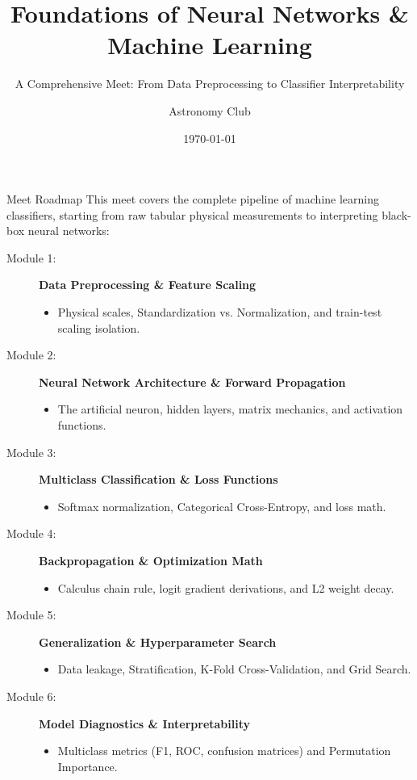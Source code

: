 \documentclass[9pt]{beamer}
\title{Foundations of Neural Networks \& Machine Learning}
\subtitle{A Comprehensive Meet: From Data Preprocessing to Classifier Interpretability}
\author{Astronomy Club}
\date{\today}
\begin{document}
\maketitle

\begin{frame}{Meet Roadmap}
  This meet covers the complete pipeline of machine learning classifiers, starting from raw tabular physical measurements to interpreting black-box neural networks:
  \begin{description}
    \item[Module 1:] \textbf{Data Preprocessing \& Feature Scaling}
      \begin{itemize}
        \item Physical scales, Standardization vs. Normalization, and train-test scaling isolation.
      \end{itemize}
    \item[Module 2:] \textbf{Neural Network Architecture \& Forward Propagation}
      \begin{itemize}
        \item The artificial neuron, hidden layers, matrix mechanics, and activation functions.
      \end{itemize}
    \item[Module 3:] \textbf{Multiclass Classification \& Loss Functions}
      \begin{itemize}
        \item Softmax normalization, Categorical Cross-Entropy, and loss math.
      \end{itemize}
    \item[Module 4:] \textbf{Backpropagation \& Optimization Math}
      \begin{itemize}
        \item Calculus chain rule, logit gradient derivations, and L2 weight decay.
      \end{itemize}
    \item[Module 5:] \textbf{Generalization & Hyperparameter Search}
      \begin{itemize}
        \item Data leakage, Stratification, K-Fold Cross-Validation, and Grid Search.
      \end{itemize}
    \item[Module 6:] \textbf{Model Diagnostics \& Interpretability}
      \begin{itemize}
        \item Multiclass metrics (F1, ROC, confusion matrices) and Permutation Importance.
      \end{itemize}
  \end{description}
\end{frame}
\end{document}
